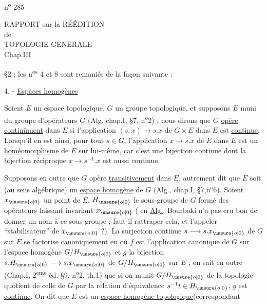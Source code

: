 \hfill n\textsuperscript{o} 285
\begin{center}
RAPPORT sur la RÉÉDITION\\
de\\
TOPOLOGIE GENERALE\\
Chap.III
\end{center}

§2 ; les n\textsuperscript{os} 4 et 8 sont remaniés de la façon suivante :

4. - \uline{Espaces homogènes}

Soient $E$ un espace topologique, $G$ un groupe topologique, et supposons $E$ muni du groupe d'opérateurs $G$ (Alg. chap.I, §7, n\textsuperscript{o}2) ; nous dirons que $G$ \uline{opère continûment} dans $E$ si l'application $(s,x)\longrightarrow s.x$ de $G\times E$ dans $E$ est \uline{continue}. Lorsqu'il en est ainsi, pour tout $s\in G$, l'application $x\longrightarrow s.x$ de $E$ dans $E$ est un \uline{homéomorphisme} de $E$ sur lui-même, car c'est une bijection continue dont la bijection réciproque $x\longrightarrow s^{-1}.x$ est aussi continue.

Supposons en outre que $G$ opère \uline{transitivement} dans $E$, autrement dit que $E$ soit (au sens algébrique) un \uline{espace homogène} de $G$ (Alg., chap.I, §7,n\textsuperscript{o}6). Soient $x_{\unsure{o|0}}$ un point de $E$, $H_{\unsure{o|0}}$ le sous-groupe de $G$ formé des opérateurs laissant invariant $x_{\unsure{o|0}}$ ( en \uline{Alg.}, Bourbaki n'a pas cru bon de donner un nom à ce sous-groupe ; faut-il rattraper cela, et l'appeler ``stabilisateur'' de $x_{\unsure{o|0}}$ ?). La surjection continue $s\longrightarrow s.x_{\unsure{o|0}}$ de $G$ sur $E$ se factorise canoniquement en
où $f$ est l'application canonique de $G$ sur l'espace homogène $G/H_{\unsure{o|0}}$ et $g$ la bijection $s.H_{\unsure{o|0}}\longrightarrow s.x_{\unsure{o|0}}$ de $G/H_{\unsure{o|0}}$ sur $E$ ; on sait en outre (Chap.I, 2\textsuperscript{eme} éd. §9, n\textsuperscript{o}2, th.1) que si on munit $G/H_{\unsure{o|0}}$ de la topologie quotient de celle de $G$ par la relation d'équivalence $s^{-1}t\in H_{\unsure{o|0}}$, $g$ est \uline{continue}. On dit que $E$ est un \uline{espace homogène topologique}(correspondant
